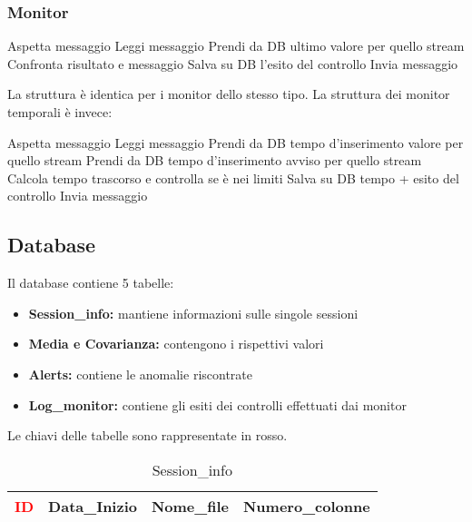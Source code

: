 \documentclass{article}
\begin{document}
\subsubsection{Monitor}

\begin{algorithmic}
	\State Aspetta messaggio
    \State Leggi messaggio
	\State Prendi da DB ultimo valore per quello stream
	\State Confronta risultato e messaggio
	\State Salva su DB l'esito del controllo
    \State Invia messaggio
	\EndWhile
\end{algorithmic}

\vspace{1pt}

La struttura è identica per i monitor dello stesso tipo. 
\newline
La struttura dei monitor temporali è invece:

\vspace{1pt}

\begin{algorithmic}
	\State Aspetta messaggio
    \State Leggi messaggio
	\State Prendi da DB tempo d'inserimento valore per quello stream
    \State Prendi da DB tempo d'inserimento avviso per quello stream
	\State Calcola tempo trascorso e controlla se è nei limiti
	\State Salva su DB tempo + esito del controllo
    \State Invia messaggio
	\EndWhile
\end{algorithmic}

\newpage

\subsection{Database}
Il database contiene 5 tabelle:
\begin{itemize}
	\item \textbf{Session\_info:} mantiene informazioni sulle singole sessioni 
	\item \textbf{Media e Covarianza:} contengono i rispettivi valori
	\item \textbf{Alerts:} contiene le anomalie riscontrate
	\item \textbf{Log\_monitor:} contiene gli esiti dei controlli effettuati dai monitor
\end{itemize}

\vspace{2pt}
Le chiavi delle tabelle sono rappresentate in rosso.
\vspace{2pt}

\begin{table}[H]
    \centering
    \begin{tabular}{|c|c|c|c|}
        \hline
        \textcolor{red}{ID} & Data\_Inizio & Nome\_file & Numero\_colonne\\
        \hline
    \end{tabular}
    \caption{Session\_info}
    \label{tab:session_info}
\end{table}
\end{document}
